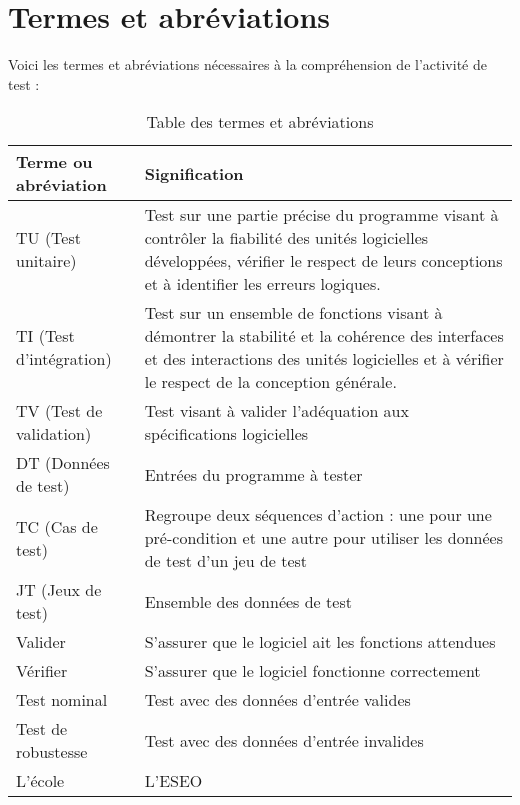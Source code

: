 	\section{Termes et abréviations}

Voici les termes et abréviations nécessaires à la compréhension de l'activité de test :\\

\begin{table}[!h]
\begin{center}
\begin{tabular}{|p{5cm}|p{9cm}|}
\hline
\textbf{Terme ou abréviation} & \textbf{Signification}\\
\hline
TU (Test unitaire) & Test sur une partie précise du programme visant à contrôler la fiabilité des unités logicielles développées, vérifier le respect de leurs conceptions et à identifier les erreurs logiques.\\
\hline
TI (Test d’intégration) & Test sur un ensemble de fonctions visant à démontrer la stabilité et la cohérence des interfaces et des interactions des unités logicielles et à vérifier le respect de la conception générale.\\
\hline
TV (Test de validation) & Test visant à valider l’adéquation aux spécifications logicielles\\
\hline
DT (Données de test) & Entrées du programme à tester\\
\hline
TC (Cas de test) & Regroupe deux séquences d’action : une pour une pré-condition et une autre pour utiliser les données de test d’un jeu de test\\
\hline
JT (Jeux de test) & Ensemble des données de test\\
\hline
Valider & S’assurer que le logiciel ait les fonctions attendues\\
\hline
Vérifier & S’assurer que le logiciel fonctionne correctement\\
\hline
Test nominal & Test avec des données d’entrée valides\\
\hline
Test de robustesse & Test avec des données d’entrée invalides\\
\hline
L'école & L'ESEO\\
\hline
\end{tabular}
\end{center}
\caption{Table des termes et abréviations}
\end{table}